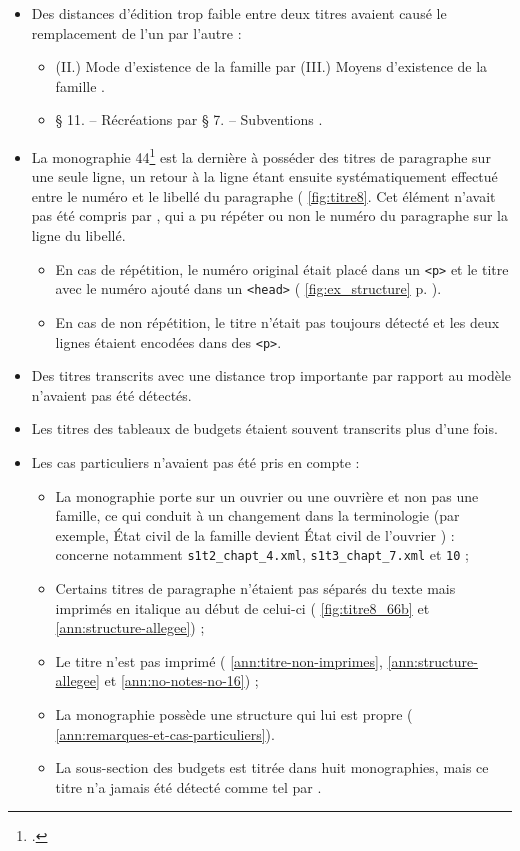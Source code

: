 \begin{itemize}
    \item Des distances d'édition trop faible entre deux titres avaient causé le remplacement de l'un par l'autre :
    \begin{itemize}
        \item (II.) \og Mode d'existence de la famille \fg{} par (III.) \og Moyens d'existence de la famille \fg.
        \item \og § 11. -- Récréations \fg{} par \og § 7. -- Subventions \fg.
    \end{itemize}
    \item La monographie \no{}44\footcite{mono044a} est la dernière à posséder des titres de paragraphe sur une seule ligne, un retour à la ligne étant ensuite systématiquement effectué entre le numéro et le libellé du paragraphe (\fig{} \ref{fig:titre8}. Cet élément n'avait pas été compris par \lse, qui a pu répéter ou non le numéro du paragraphe sur la ligne du libellé.
    \begin{itemize}
        \item En cas de répétition, le numéro original était placé dans un \texttt{<p>} et le titre avec le numéro ajouté dans un \texttt{<head>} (\fig{} \ref{fig:ex_structure} p. \pageref{fig:ex_structure}).
        \item En cas de non répétition, le titre n'était pas toujours détecté et les deux lignes étaient encodées dans des \texttt{<p>}.
    \end{itemize}
    \item Des titres transcrits avec une distance trop importante par rapport au modèle n'avaient pas été détectés.
    \item Les titres des tableaux de budgets étaient souvent transcrits plus d'une fois.
    \item Les cas particuliers n'avaient pas été pris en compte :
    \begin{itemize}
        \item La monographie porte sur un ouvrier ou une ouvrière et non pas une famille, ce qui conduit à un changement dans la terminologie (par exemple, \og État civil de la famille \fg{} devient \og État civil de l'ouvrier \fg) : concerne notamment \texttt{s1t2\_chapt\_4.xml}, \texttt{s1t3\_chapt\_7.xml} et \texttt{10} ;
        \item Certains titres de paragraphe n'étaient pas séparés du texte mais imprimés en italique au début de celui-ci (\fig{} \ref{fig:titre8_66b} et \ann{} \ref{ann:structure-allegee}) ;
        \item Le titre n'est pas imprimé (\ann{} \ref{ann:titre-non-imprimes}, \ref{ann:structure-allegee} et \ref{ann:no-notes-no-16}) ;
        \item La monographie possède une structure qui lui est propre (\ann{} \ref{ann:remarques-et-cas-particuliers}).
        \item La sous-section des budgets est titrée dans huit monographies, mais ce titre n'a jamais été détecté comme tel par \lse.
    \end{itemize}
\end{itemize}

